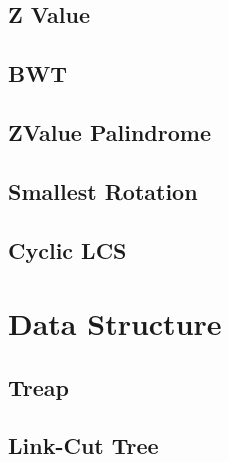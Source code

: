 \documentclass[a4paper,10pt,twocolumn,oneside]{article}
\begin{document}
\subsection{Z Value}


\subsection{BWT}


\subsection{ZValue Palindrome}


\subsection{Smallest Rotation}


%

\subsection{Cyclic LCS}


\section{Data Structure}

\subsection{Treap}


\subsection{Link-Cut Tree}


%
\end{document}
